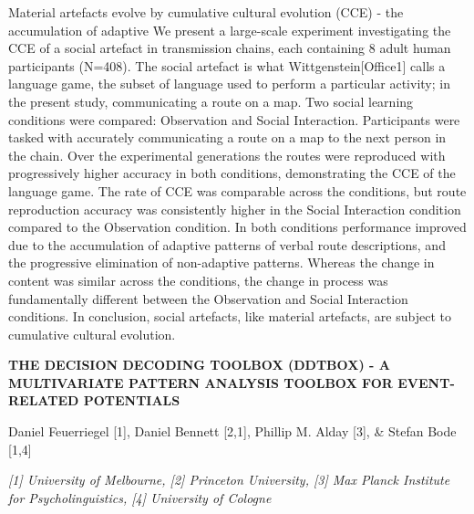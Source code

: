 \documentclass[]{article}
\begin{document}
Material artefacts evolve by cumulative cultural evolution (CCE) - the
accumulation of adaptive We present a large-scale experiment
investigating the CCE of a social artefact in transmission chains, each
containing 8 adult human participants (N=408). The social artefact is
what Wittgenstein{[}Office1{]} calls a language game, the subset of
language used to perform a particular activity; in the present study,
communicating a route on a map. Two social learning conditions were
compared: Observation and Social Interaction. Participants were tasked
with accurately communicating a route on a map to the next person in the
chain. Over the experimental generations the routes were reproduced with
progressively higher accuracy in both conditions, demonstrating the CCE
of the language game. The rate of CCE was comparable across the
conditions, but route reproduction accuracy was consistently higher in
the Social Interaction condition compared to the Observation condition.
In both conditions performance improved due to the accumulation of
adaptive patterns of verbal route descriptions, and the progressive
elimination of non-adaptive patterns. Whereas the change in content was
similar across the conditions, the change in process was fundamentally
different between the Observation and Social Interaction conditions. In
conclusion, social artefacts, like material artefacts, are subject to
cumulative cultural evolution.

\textbf{THE DECISION DECODING TOOLBOX (DDTBOX) - A MULTIVARIATE PATTERN
ANALYSIS TOOLBOX FOR EVENT-RELATED POTENTIALS}

Daniel Feuerriegel {[}1{]}, Daniel Bennett {[}2,1{]}, Phillip M. Alday
{[}3{]}, \& Stefan Bode {[}1,4{]}

\emph{{[}1{]} University of Melbourne, {[}2{]} Princeton University,
{[}3{]} Max Planck Institute for Psycholinguistics, {[}4{]} University
of Cologne}
\end{document}
